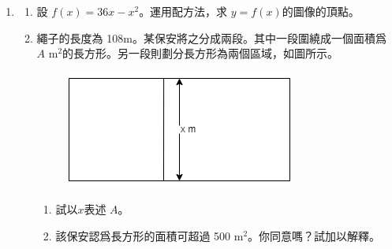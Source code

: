 \documentclass[11pt]{article}
\begin{document}
\begin{enumerate}
            \hrulefill
                
            \hrulefill
            
            \hrulefill
            
            \hrulefill
            
            \hrulefill
            
            \hrulefill
            
            \hrulefill
            
            \hrulefill
            
            \hrulefill
            
            \hrulefill
            
            \hrulefill
            
            \hrulefill
            
            \hrulefill
            
            \hrulefill
            
            \hrulefill
            
            \hrulefill
            
            \hrulefill
            
            \hrulefill
            
            \hrulefill
            
            \hrulefill
            
            \hrulefill
            
            \hrulefill
            
            \hrulefill

        \pagebreak
        \item \begin{enumerate}
            \item 設 $f(x)=36x-x^2$。運用配方法，求 $y=f(x)$的圖像的頂點。
            \item 繩子的長度為 108m。某保安將之分成兩段。其中一段圍繞成一個面積爲 $A$ m$^2$的長方形。另一段則劃分長方形為兩個區域，如圖所示。\begin{figure}[H]
                \centering
                \includegraphics[scale=0.4]{f4finalq3.png}
            \end{figure}\begin{enumerate}
                \item 試以$x$表述 $A$。
                \item 該保安認爲長方形的面積可超過 500 m$^{2}$。你同意嗎？試加以解釋。
            \end{enumerate}
        \end{enumerate}
        

\end{enumerate}
\end{document}
